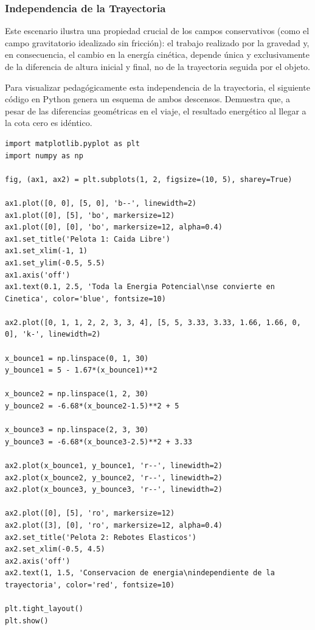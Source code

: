 \documentclass[12pt, a4paper]{article}
\begin{document}
\subsubsection*{Independencia de la Trayectoria}

Este escenario ilustra una propiedad crucial de los campos conservativos (como el campo gravitatorio idealizado sin fricción): el trabajo realizado por la gravedad y, en consecuencia, el cambio en la energía cinética, depende única y exclusivamente de la diferencia de altura inicial y final, no de la trayectoria seguida por el objeto.

Para visualizar pedagógicamente esta independencia de la trayectoria, el siguiente código en Python genera un esquema de ambos descensos. Demuestra que, a pesar de las diferencias geométricas en el viaje, el resultado energético al llegar a la cota cero es idéntico.

\begin{lstlisting}
import matplotlib.pyplot as plt
import numpy as np

fig, (ax1, ax2) = plt.subplots(1, 2, figsize=(10, 5), sharey=True)

ax1.plot([0, 0], [5, 0], 'b--', linewidth=2)
ax1.plot([0], [5], 'bo', markersize=12)
ax1.plot([0], [0], 'bo', markersize=12, alpha=0.4)
ax1.set_title('Pelota 1: Caida Libre')
ax1.set_xlim(-1, 1)
ax1.set_ylim(-0.5, 5.5)
ax1.axis('off')
ax1.text(0.1, 2.5, 'Toda la Energia Potencial\nse convierte en Cinetica', color='blue', fontsize=10)

ax2.plot([0, 1, 1, 2, 2, 3, 3, 4], [5, 5, 3.33, 3.33, 1.66, 1.66, 0, 0], 'k-', linewidth=2)

x_bounce1 = np.linspace(0, 1, 30)
y_bounce1 = 5 - 1.67*(x_bounce1)**2

x_bounce2 = np.linspace(1, 2, 30)
y_bounce2 = -6.68*(x_bounce2-1.5)**2 + 5

x_bounce3 = np.linspace(2, 3, 30)
y_bounce3 = -6.68*(x_bounce3-2.5)**2 + 3.33

ax2.plot(x_bounce1, y_bounce1, 'r--', linewidth=2)
ax2.plot(x_bounce2, y_bounce2, 'r--', linewidth=2)
ax2.plot(x_bounce3, y_bounce3, 'r--', linewidth=2)

ax2.plot([0], [5], 'ro', markersize=12)
ax2.plot([3], [0], 'ro', markersize=12, alpha=0.4)
ax2.set_title('Pelota 2: Rebotes Elasticos')
ax2.set_xlim(-0.5, 4.5)
ax2.axis('off')
ax2.text(1, 1.5, 'Conservacion de energia\nindependiente de la trayectoria', color='red', fontsize=10)

plt.tight_layout()
plt.show()
\end{lstlisting}
\end{document}
